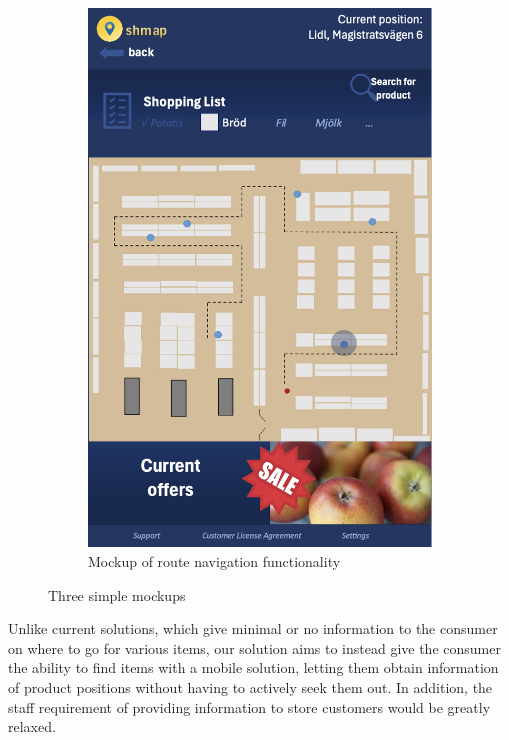 \documentclass[titlepage]{article}
\begin{document}
\begin{figure}[h!]
\begin{subfigure}[b]{0.3\linewidth}
      \includegraphics[width=\textwidth]{ShopRoute.png}
    \caption{Mockup of route navigation functionality}
      \end{subfigure}
    \caption{Three simple mockups}
    \label{fig:mockups}
\end{figure}

Unlike current solutions, which give minimal or no information to the consumer on where to go for various items,
our solution aims to instead give the consumer the ability to find items with a mobile solution,
letting them obtain information of product positions without having to actively seek them out.
In addition, the staff requirement of providing information to store customers would be greatly relaxed.
\end{document}

